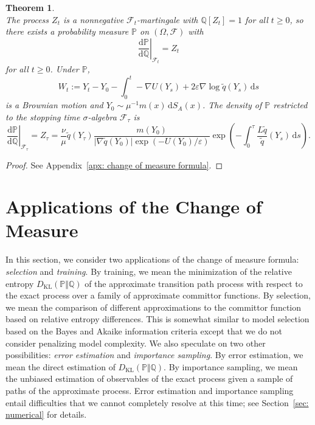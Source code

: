 \documentclass[reqno]{amsart}
\newcommand{\eps}{\varepsilon}
\newcommand{\1}{\mathds{1}}
\renewcommand{\d}{\mathrm{d}}
\newcommand{\grad}{\nabla}
\renewcommand{\P}{\mathds{P}}
\newcommand{\Q}{\mathds{Q}}
\newcommand{\F}{\mathcal{F}}
\newcommand{\dkl}{D_{\mathrm{KL}}}
\newtheorem{theorem}{Theorem}
\theoremstyle{definition}
\theoremstyle{remark}
\begin{document}
\begin{theorem}
\begin{equation*}
  \end{equation*}
  The process $Z_t$ is a nonnegative $\F_t$-martingale with $\Q[ Z_t]=1$ for all $t \geq 0$, so there exists a probability measure $\P$ on $(\Omega, \F)$ with
  \begin{equation*}
    \left . \frac{\d \P}{\d \Q} \right \rvert_{\F_t} = Z_t
  \end{equation*}
  for all $t \geq 0$. 
  Under $\P$,
  \begin{equation*}
    W_t :=   Y_{t} - Y_0 - \int_0^{t} - \grad U (Y_s) + 2 \eps \grad \log \tilde q(Y_s) \, \d s
  \end{equation*}
  is a Brownian motion and $Y_0 \sim \mu^{-1} m(x) \, \d S_A(x)$. 
  The density of $\P$ restricted to the stopping time $\sigma$-algebra $\F_\tau$ is
  \begin{equation}\label{eq: computable change of measure}
     \left . \frac{\d \P}{\d \Q} \right \rvert_{\F_\tau} = Z_\tau =  \frac{\nu}{\mu} \tilde q(Y_\tau) \frac{ m(Y_0)}{\lvert \grad \tilde q (Y_0) \rvert \exp(-U(Y_0)/\eps)}\exp \left (-\int_0^\tau  \frac{L \tilde q}{\tilde q}(Y_s)\, \d s \right ).
  \end{equation}
\end{theorem}

\begin{proof}
See Appendix~\ref{apx: change of measure formula}.
\end{proof}

\section{Applications of the Change of Measure}
\label{sec: applications}

In this section, we consider two applications of the change of measure formula: \emph{selection} and \emph{training}. By training, we mean the minimization of the relative entropy $\dkl ( \P \Vert \Q)$ of the approximate transition path process with respect to the exact process over a family of approximate committor functions. By selection, we mean the comparison of different approximations to the committor function based on relative entropy differences. This is somewhat similar to model selection based on the Bayes and Akaike information criteria except that we do not consider penalizing model complexity. We also speculate on two other possibilities: \emph{error estimation} and \emph{importance sampling}. By error estimation, we mean the direct estimation of $\dkl(\P \Vert \Q)$. By importance sampling, we mean the unbiased estimation of observables of the exact process given a sample of paths of the approximate process. Error estimation and importance sampling entail difficulties that we cannot completely resolve at this time; see Section~\ref{sec: numerical} for details.
\end{document}
